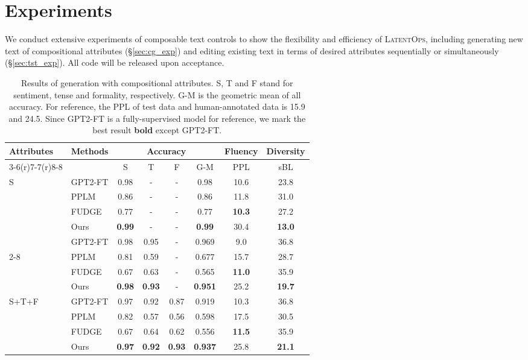 \documentclass[11pt]{article}
\begin{document}
\section{Experiments}\label{sec:exp}
We conduct extensive experiments of composable text controls to show the flexibility and efficiency of \textsc{LatentOps}, including generating new text of compositional attributes (\S\ref{sec:cg_exp}) and editing existing text in terms of desired attributes sequentially or simultaneously (\S\ref{sec:tst_exp}). 
All code will be released upon acceptance.
\begin{table}[t]
\vspace{-15pt}
\setlength\tabcolsep{3.4pt}
\scriptsize
\centering
\begin{tabular}{llcccccc}
\toprule
\multirow{3}{*}{Attributes} &\multirow{3}{*}{Methods} & \multicolumn{4}{c}{Accuracy} &  Fluency & Diversity\\\cmidrule(r){3-6}\cmidrule(r){7-7}\cmidrule(r){8-8}
& &S & T & F & G-M &PPL & sBL    \\
\midrule
\multirow{5}{*}{S}
                 & GPT2-FT& 0.98 & -&-&0.98 & 10.6 & 23.8\\\cmidrule{2-8}
                 & PPLM &0.86&-&-&0.86&11.8&31.0 \\
                & FUDGE&0.77&-&-&0.77&\textbf{10.3}&27.2\\
                 & Ours &\textbf{0.99} &-&-&\textbf{0.99} & 30.4 & \textbf{13.0} \\
                 \midrule
\multirow{5}{*}{S+T} 
                 & GPT2-FT   &0.98&0.95&-&0.969&9.0&36.8 \\\cmidrule{2-8}
                 & PPLM&0.81&0.59&-&0.677&15.7&28.7 \\
                & FUDGE&0.67&0.63&-&0.565&\textbf{11.0}&35.9\\
                 & Ours &\textbf{0.98}& \textbf{0.93}& -&\textbf{0.951}& 25.2& \textbf{19.7}\\
                 \midrule
\multirow{5}{*}{S+T+F} 
                 & GPT2-FT  &0.97&0.92&0.87&0.919&10.3&36.8 \\\cmidrule{2-8}
                 & PPLM &0.82&0.57&0.56&0.598&17.5&30.5  \\
                &FUDGE&0.67&0.64&0.62&0.556&\textbf{11.5}&35.9\\
                 & Ours &\textbf{0.97}& \textbf{0.92}& \textbf{0.93}       &\textbf{0.937}   & 25.8            & \textbf{21.1}\\
                 \midrule
\end{tabular}
\caption{Results of generation with compositional attributes. S, T and F stand for sentiment, tense and formality, respectively.  G-M is the geometric mean of all accuracy. 
  For reference, the PPL of test data and human-annotated data is 15.9 and 24.5. Since GPT2-FT is a fully-supervised model for reference, we mark the best result \textbf{bold} except GPT2-FT.
}
\label{tab:multi_cg}
\vspace{-10pt}
\end{table}
\end{document}
